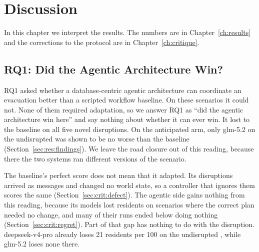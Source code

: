 \chapter{Discussion}
\label{ch:discussion}

%

In this chapter we interpret the results. The numbers are in
Chapter~\ref{ch:results} and the corrections to the protocol are in
Chapter~\ref{ch:critique}.

\section{RQ1: Did the Agentic Architecture Win?}
\label{sec:disc:interpretation}

RQ1 asked whether a database-centric agentic architecture can coordinate an
evacuation better than a scripted workflow baseline. On these scenarios it
could not. None of them required adaptation, so we answer RQ1 as ``did the
agentic architecture win here'' and say nothing about whether it can ever win.
It lost to the baseline on all five novel disruptions. On the
anticipated arm, only glm-5.2 on the undisrupted  was shown
to be no worse than the baseline (Section~\ref{sec:res:findings}). We leave
the road closure out of this reading, because there the two systems ran
different versions of the scenario.

The baseline's perfect score does not mean that it adapted. Its disruptions
arrived as messages and changed no world state, so a controller that ignores
them scores the same (Section~\ref{sec:crit:defect}). The agentic side gains
nothing from this reading, because its models lost residents on scenarios
where the correct plan needed no change, and many of their runs ended below doing nothing
(Section~\ref{sec:crit:regret}). Part of that gap has nothing to do with the
disruption. deepseek-v4-pro already loses 21 residents per 100 on the
undisrupted , while glm-5.2 loses none there.

